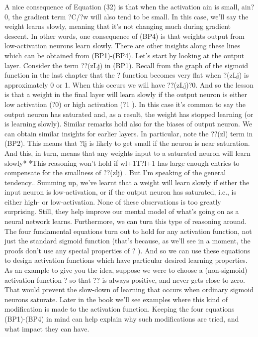 A nice consequence of Equation (32) is that when the activation ain is small, ain?0, the gradient term ?C/?w will also tend to be small. In this case, we'll say the weight learns slowly, meaning that it's not changing much during gradient descent. In other words, one consequence of (BP4) is that weights output from low-activation neurons learn slowly.
There are other insights along these lines which can be obtained from (BP1)-(BP4). Let's start by looking at the output layer. Consider the term ??(zLj)
in (BP1). Recall from the graph of the sigmoid function in the last chapter that the ? function becomes very flat when ?(zLj) is approximately 0 or 1. When this occurs we will have ??(zLj)?0. And so the lesson is that a weight in the final layer will learn slowly if the output neuron is either low activation (?0) or high activation (?1
). In this case it's common to say the output neuron has saturated and, as a result, the weight has stopped learning (or is learning slowly). Similar remarks hold also for the biases of output neuron.
We can obtain similar insights for earlier layers. In particular, note the ??(zl)
term in (BP2). This means that ?lj is likely to get small if the neuron is near saturation. And this, in turn, means that any weights input to a saturated neuron will learn slowly* *This reasoning won't hold if wl+1T?l+1 has large enough entries to compensate for the smallness of ??(zlj)
. But I'm speaking of the general tendency..
Summing up, we've learnt that a weight will learn slowly if either the input neuron is low-activation, or if the output neuron has saturated, i.e., is either high- or low-activation. 
None of these observations is too greatly surprising. Still, they help improve our mental model of what's going on as a neural network learns. Furthermore, we can turn this type of reasoning around. The four fundamental equations turn out to hold for any activation function, not just the standard sigmoid function (that's because, as we'll see in a moment, the proofs don't use any special properties of ?
). And so we can use these equations to design activation functions which have particular desired learning properties. As an example to give you the idea, suppose we were to choose a (non-sigmoid) activation function ? so that ??
is always positive, and never gets close to zero. That would prevent the slow-down of learning that occurs when ordinary sigmoid neurons saturate. Later in the book we'll see examples where this kind of modification is made to the activation function. Keeping the four equations (BP1)-(BP4) in mind can help explain why such modifications are tried, and what impact they can have.

